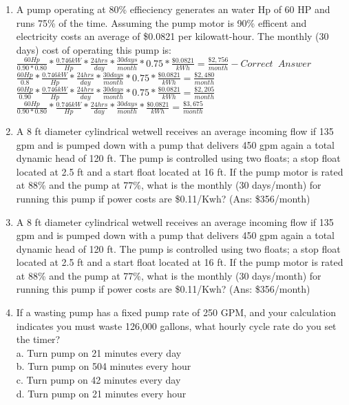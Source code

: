\begin{enumerate}
\item A pump operating at 80\% effieciency generates an water Hp of 60 HP and runs 75\% of the time. Assuming the pump motor is 90\% efficent and electricity costs an average of \$0.0821 per kilowatt-hour. The monthly (30 days) cost of operating this pump is:\\
\vspace{0.4cm}
$\frac{60Hp}{0.90*0.80}*\frac{0.746kW}{Hp}*\frac{24hrs}{day}*\frac{30days}{month}*0.75*\frac{\$0.0821}{kWh}=\boxed{\frac{\$2,756}{month}} - Correct \enspace Answer$\\
$\frac{60Hp}{0.8}*\frac{0.746kW}{Hp}*\frac{24hrs}{day}*\frac{30days}{month}*0.75*\frac{\$0.0821}{kWh}=\boxed{\frac{\$2,480}{month}}$\\
$\frac{60Hp}{0.90}*\frac{0.746kW}{Hp}*\frac{24hrs}{day}*\frac{30days}{month}*0.75*\frac{\$0.0821}{kWh}=\boxed{\frac{\$2,205}{month}}$\\
$\frac{60Hp}{0.90*0.80}*\frac{0.746kW}{Hp}*\frac{24hrs}{day}*\frac{30days}{month}*\frac{\$0.0821}{kWh}=\boxed{\frac{\$3,675}{month}}$

\item A 8 ft diameter cylindrical wetwell receives an average incoming flow if 135 gpm and is pumped down with a pump that delivers 450 gpm again a total dynamic head of 120 ft. The pump is controlled using two floats; a stop float located at 2.5 ft and a start float located at 16 ft. If the pump motor is rated at 88\% and the pump at 77\%, what is the monthly (30 days/month) for running this pump if power costs are \$0.11/Kwh? (Ans: \$356/month) 

\item  A 8 ft diameter cylindrical wetwell receives an average incoming flow if 135 gpm and is pumped down with a pump that delivers 450 gpm again a total dynamic head of 120 ft. The pump is controlled using two floats; a stop float located at 2.5 ft and a start float located at 16 ft. If the pump motor is rated at 88\% and the pump at 77\%, what is the monthly (30 days/month) for running this pump if power costs are \$0.11/Kwh? (Ans: \$356/month)


\item If a wasting pump has a fixed pump rate of 250 GPM, and your calculation
indicates you must waste 126,000 gallons, what hourly cycle rate do you set
the timer?\\
a. Turn pump on 21 minutes every day\\
b. Turn pump on 504 minutes every hour\\
c. Turn pump on 42 minutes every day\\
d. Turn pump on 21 minutes every hour\\


\end{enumerate}
